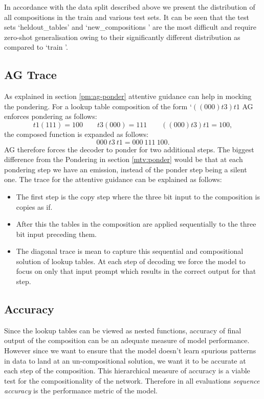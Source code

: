 In accordance with the data split described above we present the distribution of all compositions in the train and various test sets. It can be seen that the test sets \lq heldout\_tables\rq{} and \lq new\_compositions \rq{} are the most difficult and require zero-shot generalisation owing to their significantly different distribution as compared to \lq train \rq{}.

\subsection{AG Trace}
As explained in section \ref{pm:ag-ponder} attentive guidance can help in mocking the pondering. For a lookup table composition of the form \lq $((000)t3)t1$ AG enforces pondering as follows:
\begin{equation}
t1(111) = 100 \qquad t3(000) = 111 \qquad ((000)t3)t1 = 100,
\end{equation}
the composed function is expanded as follows:
\begin{equation}
000\ t3\ t1 = 000\ 111\ 100.
\end{equation}
AG therefore forces the decoder to ponder for two additional steps. The biggest difference from the Pondering in section \ref{mtv:ponder} would be that at each pondering step we have an emission, instead of the ponder step being a silent one. The trace for the attentive guidance can be explained as follows:
\begin{itemize}
	\item The first step is the copy step where the three bit input to the composition is copies as if.
	\item After this the tables in the composition are applied sequentially to the three bit input preceding them.
	\item The diagonal trace is mean to capture this sequential and compositional solution of lookup tables. At each step of decoding we force the model to focus on only that input prompt which results in the correct output for that step.
\end{itemize}


\subsection{Accuracy}
Since the lookup tables can be viewed as nested functions, accuracy of final output of the composition can be an adequate measure of model performance. However since we want to ensure that the model doesn't learn spurious patterns in data to land at an un-compositional solution, we want it to be accurate at each step of the composition. This hierarchical measure of accuracy is a viable test for the compositionality of the network. Therefore in all evaluations \textit{sequence accuracy} is the performance metric of the model.

